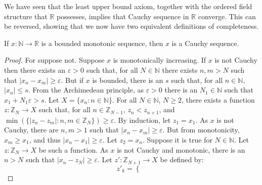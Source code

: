 \documentclass[crop=false,class=book,oneside]{standalone}
\begin{document}
            We have seen that the least upper bound axiom,
            together with the ordered field structure that
            $\mathbb{R}$ possesses, implies that
            Cauchy sequence in $\mathbb{R}$ converge. This can
            be reversed, showing that we now have two equivalent
            definitions of completeness.
            \begin{theorem}
                If $x:\mathbb{N}\rightarrow\mathbb{R}$
                is a bounded monotonic sequence, then
                $x$ is a Cauchy sequence.
            \end{theorem}
            \begin{proof}
                For suppose not. Suppose $x$ is monotonically
                increasing. If $x$ is not Cauchy
                then there exists an $\varepsilon>0$ such
                that, for all $N\in\mathbb{N}$ there exists
                $n,m>N$ such that
                $|x_{n}-x_{m}|\geq\varepsilon$. But if
                $x$ is bounded, there is an $s$ such that,
                for all $n\in\mathbb{N}$, $|x_{n}|\leq{s}$.
                From the Archimedean principle, as
                $\varepsilon>0$ there is an $N_{1}\in\mathbb{N}$
                such that $x_{1}+N_{1}\varepsilon>s$.
                Let $X=\{x_{n}:n\in\mathbb{N}\}$.
                For all $N\in\mathbb{N}$, $N\geq{2}$,
                there exists a function
                $z:\mathbb{Z}_{N}\rightarrow{X}$ such that, for
                all $n\in\mathbb{Z}_{N-1}$,
                $z_{n}<z_{n+1}$, and
                $\min(\{|z_{n}-z_{m}|:n,m\in\mathbb{Z}_{N}\})%
                 \geq\varepsilon$. By induction,
                let $z_{1}=x_{1}$. As $x$ is not Cauchy, there
                are $n,m>1$ such that
                $|x_{n}-x_{m}|\geq\varepsilon$. But from
                monotonicity, $x_{m}\geq{x}_{1}$, and thus
                $|x_{n}-x_{1}|\geq\varepsilon$.
                Let $z_{2}=x_{n}$. Suppose it is true for
                $N\in\mathbb{N}$. Let
                $z:\mathbb{Z}_{N}\rightarrow{X}$ be such a
                function. As $x$ is not Cauchy and
                monotonic, there is an $n>N$ such that
                $|x_{n}-z_{N}|\geq\varepsilon$.
                Let $z':\mathbb{Z}_{N+1}\rightarrow{X}$
                be defined by:
                \begin{subequations}
                    \begin{equation}
                        z'_{k}=
                        \begin{cases}

\end{cases}
\end{equation}
\end{subequations}
\end{proof}
\end{document}
